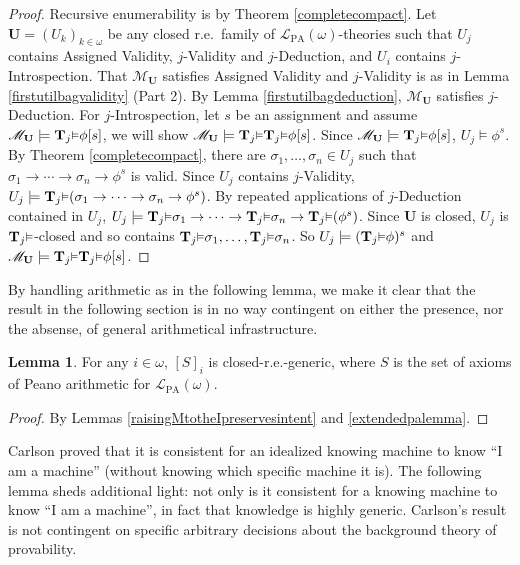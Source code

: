 \documentclass[reqno]{article}
\theoremstyle{definition}
\newtheorem{lemma}[theorem]{Lemma}
\def\L{\mathscr{L}}
\def\M{\mathscr{M}}
\def\T{\mathbf{T}}
\def\U{\mathbf{U}}
\def\LPA{\L_{\mathrm{PA}}}
\renewcommand{\Pr}[1]{\T_{#1}\mbox{\small${\vDash}$}}
\begin{document}
\begin{proof}
Recursive enumerability is by Theorem \ref{completecompact}.
Let $\U=(U_k)_{k\in\omega}$ be any closed r.e.~family
of $\LPA(\omega)$-theories such that $U_j$ contains Assigned Validity, $j$-Validity and $j$-Deduction,
and $U_i$ contains $j$-Introspection.
That $\M_{\U}$ satisfies Assigned Validity and $j$-Validity is as in
Lemma \ref{firstutilbagvalidity} (Part 2).
By Lemma \ref{firstutilbagdeduction},
$\M_{\U}$ satisfies $j$-Deduction.
For $j$-Introspection, let $s$ be an assignment and assume
$\M_{\U}\models \Pr j\phi[s]$, we will show $\M_{\U}\models\Pr j\Pr j\phi[s]$.
Since $\M_{\U}\models \Pr j\phi[s]$, $U_j\models\phi^s$.
By Theorem \ref{completecompact}, there are $\sigma_1,\ldots,\sigma_n\in U_j$
such that $\sigma_1\rightarrow\cdots\rightarrow\sigma_n\rightarrow\phi^s$
is valid.
Since $U_j$ contains $j$-Validity,
$U_j\models \Pr j(\sigma_1\rightarrow\cdots\rightarrow\sigma_n\rightarrow\phi^s)$.
By repeated applications of $j$-Deduction contained in $U_j$,
$U_j\models \Pr j\sigma_1\rightarrow\cdots\rightarrow\Pr j\sigma_n\rightarrow \Pr j(\phi^s)$.
Since $\U$ is closed, $U_j$ is $\Pr j$-closed and
so contains $\Pr j\sigma_1,\ldots,\Pr j\sigma_n$.
So $U_j\models (\Pr j\phi)^s$ and $\M_{\U}\models \Pr j\Pr j\phi[s]$.
\end{proof}

By handling arithmetic as in the following lemma, we make it clear that
the result in the following section is in no way contingent on either the
presence, nor the absense, of general arithmetical infrastructure.

\begin{lemma}
\label{firstutilbagarithmetic}
For any $i\in\omega$, $[S]_i$ is closed-r.e.-generic,
where $S$ is the set of axioms of Peano arithmetic for $\LPA(\omega)$.
\end{lemma}

\begin{proof}
By Lemmas \ref{raisingMtotheIpreservesintent} and \ref{extendedpalemma}.
\end{proof}

Carlson proved \cite{carlson2000} that it is consistent for an idealized
knowing machine to know
``I am a machine'' (without knowing which specific machine it is).
The following lemma sheds additional light: not only is it consistent for a
knowing machine to know ``I am a machine'', in fact that knowledge is
highly generic. Carlson's result is not contingent on specific arbitrary
decisions about the background theory of provability.
\end{document}
